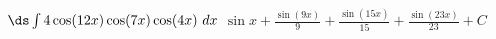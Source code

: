 {$\ds \int 4\cos(12x)\cos(7x)\cos(4x)\ dx$}
{$\sin x + \frac{\sin(9x)}{9}+\frac{\sin(15x)}{15}+\frac{\sin(23x)}{23}+ C$}
